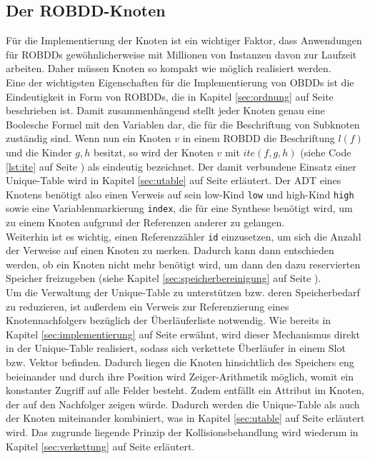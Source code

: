 \subsection{Der ROBDD-Knoten}
\label{sec:knoten}
Für die Implementierung der Knoten ist ein wichtiger Faktor, dass Anwendungen für ROBDDs gewöhnlicherweise mit Millionen von Instanzen davon zur Laufzeit arbeiten. Daher müssen Knoten so kompakt wie möglich realisiert werden.\\
Eine der wichtigsten Eigenschaften für die Implementierung von OBDDs ist die Eindeutigkeit in Form von ROBDDs, die in Kapitel \ref{sec:ordnung} auf Seite \pageref{sec:ordnung} beschrieben ist. Damit zusammenhängend stellt jeder Knoten genau eine Boolesche Formel mit den Variablen dar, die für die Beschriftung von Subknoten zuständig sind. Wenn nun ein Knoten $v$ in einem ROBDD die Beschriftung $l(f)$ und die \glqq Kinder\grqq{} $g, h$ besitzt, so wird der Knoten $v$ mit $ite(f,g,h)$ (siehe Code \ref{lst:ite} auf Seite \pageref{lst:ite}) als eindeutig bezeichnet. Der damit verbundene Einsatz einer Unique-Table wird in Kapitel \ref{sec:utable} auf Seite \pageref{sec:utable} erläutert. Der ADT eines Knotens benötigt also einen Verweis auf sein low-Kind \texttt{low} und high-Kind \texttt{high} sowie eine Variablenmarkierung \texttt{index}, die für eine Synthese benötigt wird, um zu einem Knoten aufgrund der Referenzen anderer zu gelangen.\\
Weiterhin ist es wichtig, einen Referenzzähler \texttt{id} einzusetzen, um sich die Anzahl der Verweise auf einen Knoten zu merken. Dadurch kann dann entschieden werden, ob ein Knoten nicht mehr benötigt wird, um dann den dazu reservierten Speicher freizugeben (siehe Kapitel \ref{sec:speicherbereinigung} auf Seite \pageref{sec:speicherbereinigung}).\\
Um die Verwaltung der Unique-Table zu unterstützen bzw. deren Speicherbedarf zu reduzieren, ist außerdem ein Verweis zur Referenzierung eines Knotennachfolgers bezüglich der Überläuferliste notwendig. Wie bereits in Kapitel \ref{sec:implementierung} auf Seite \pageref{sec:implementierung} erwähnt, wird dieser Mechanismus direkt in der Unique-Table realisiert, sodass sich verkettete Überläufer in einem Slot bzw. Vektor befinden. Dadurch liegen die Knoten hinsichtlich des Speichers eng beieinander und durch ihre Position wird Zeiger-Arithmetik möglich, womit ein konstanter Zugriff auf alle Felder besteht. Zudem entfällt ein Attribut im Knoten, der auf den Nachfolger zeigen würde. Dadurch werden die Unique-Table als auch der Knoten miteinander kombiniert, was in Kapitel \ref{sec:utable} auf Seite \pageref{sec:utableBdd} erläutert wird. Das zugrunde liegende Prinzip der Kollisionsbehandlung wird wiederum in Kapitel \ref{sec:verkettung} auf Seite \pageref{sec:verkettung} erläutert.\\
